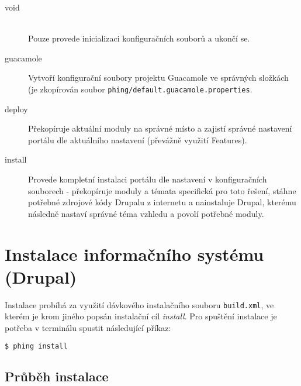 \begin{description}
  \item[void] \hfill \\
  Pouze provede inicializaci konfiguračních souborů a ukončí se.  
  \item[guacamole] 
  Vytvoří konfigurační soubory projektu Guacamole ve správných složkách (je zkopírován soubor \texttt{phing/default.guacamole.properties}.
  \item[deploy]
  Překopíruje aktuální moduly na správné místo a zajistí správné nastavení portálu dle aktuálního nastavení (převážně využití Features).
  \item[install]
  Provede kompletní instalaci portálu dle nastavení v konfiguračních souborech - překopíruje moduly a témata specifická pro toto řešení, stáhne potřebné zdrojové kódy Drupalu z internetu a nainstaluje Drupal, kterému následně nastaví správné téma vzhledu a povolí potřebné moduly.
\end{description}

\section{Instalace informačního systému (Drupal)}
Instalace probíhá za využití dávkového instalačního souboru \texttt{build.xml}, ve kterém je krom jiného popsán instalační cíl \emph{install}. Pro spuštění instalace je potřeba v terminálu spustit následující příkaz:

\begin{lstlisting}[language=bash]
  $ phing install
\end{lstlisting}

\subsection*{Průběh instalace}


